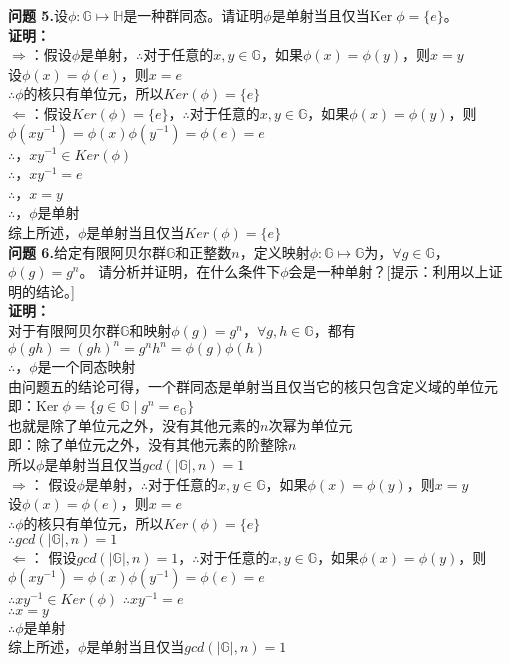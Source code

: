 \documentclass[a4paper]{CINTA}
\begin{document}
\textbf{问题 5.}设$\phi: \mathbb{G}\mapsto \mathbb{H}$是一种群同态。请证明$\phi$是单射当且仅当$\mbox{Ker}\; \phi  = \{e\}$。\\
\textbf{证明：} \\
$\Rightarrow$：假设$\phi$是单射，$\therefore$对于任意的$x,y \in \mathbb{G}$，如果$\phi(x)=\phi(y)$，则$x=y$ \\
设$\phi(x)=\phi(e)$，则$x=e$ \\
$\therefore$$\phi$的核只有单位元，所以$Ker(\phi)= \{e\}$ \\

$\Leftarrow$：假设$Ker(\phi)  = \{e\}$，$\therefore$对于任意的$x,y \in \mathbb{G}$，如果$\phi(x)=\phi(y)$，则$\phi(xy^{-1})=\phi(x)\phi(y^{-1})=\phi(e)=e$ \\
$\therefore$，$xy^{-1} \in Ker(\phi)$ \\
$\therefore$，$xy^{-1}=e$ \\
$\therefore$，$x=y$ \\
$\therefore$，$\phi$是单射 \\
综上所述，$\phi$是单射当且仅当$Ker(\phi)= \{e\}$ \\

\textbf{问题 6.}给定有限阿贝尔群$\mathbb{G}$和正整数$n$，定义映射$\phi: \mathbb{G}\mapsto \mathbb{G}$为，$\forall g \in \mathbb{G}$，$\phi(g) = g^n$。
请分析并证明，在什么条件下$\phi$会是一种单射？[提示：利用以上证明的结论。]\\
\textbf{证明：} \\
对于有限阿贝尔群$\mathbb{G}$和映射$\phi(g) = g^n$，$\forall g,h \in \mathbb{G}$，都有$\phi(gh)=(gh)^n=g^nh^n=\phi(g)\phi(h)$ \\
$\therefore$，$\phi$是一个同态映射 \\
由问题五的结论可得，一个群同态是单射当且仅当它的核只包含定义域的单位元 \\
即：$\mbox{Ker}\; \phi = \{g \in \mathbb{G} \mid g^n = e_{\mathbb{G}}\}$ \\
也就是除了单位元之外，没有其他元素的$n$次幂为单位元 \\
即：除了单位元之外，没有其他元素的阶整除$n$ \\
所以$\phi$是单射当且仅当$gcd(|\mathbb{G}|,n)=1$ \\

$\Rightarrow$：
假设$\phi$是单射，$\therefore$对于任意的$x,y \in \mathbb{G}$，如果$\phi(x)=\phi(y)$，则$x=y$ \\
设$\phi(x)=\phi(e)$，则$x=e$ \\
$\therefore$$\phi$的核只有单位元，所以$Ker(\phi)= \{e\}$ \\
$\therefore$$gcd(|\mathbb{G}|,n)=1$ \\

$\Leftarrow$：
假设$gcd(|\mathbb{G}|,n)=1$，$\therefore$对于任意的$x,y \in \mathbb{G}$，如果$\phi(x)=\phi(y)$，则$\phi(xy^{-1})=\phi(x)\phi(y^{-1})=\phi(e)=e$ \\
$\therefore$$xy^{-1} \in Ker(\phi)$
$\therefore$$xy^{-1}=e$ \\
$\therefore$$x=y$ \\
$\therefore$$\phi$是单射 \\
综上所述，$\phi$是单射当且仅当$gcd(|\mathbb{G}|,n)=1$ \\
\end{document}
